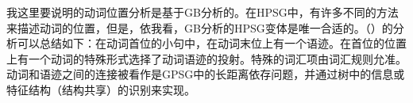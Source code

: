 \addlines[2]
我这里要说明的动词位置分析是基于GB分析的。在HPSG中，有许多不同的方法来描述动词的位置，但是，依我看，GB分析的HPSG变体是唯一合适的\citep{Mueller2005c,Mueller2005d,MuellerGS}。（）的分析可以总结如下：在动词首位的小句中，在动词末位上有一个语迹。在首位的位置上有一个动词的特殊形式选择了动词语迹的投射。特殊的词汇项由词汇规则允准。动词和语迹之间的连接被看作是GPSG中的长距离依存问题，并通过树中的信息或特征结构（结构共享）的识别来实现。


